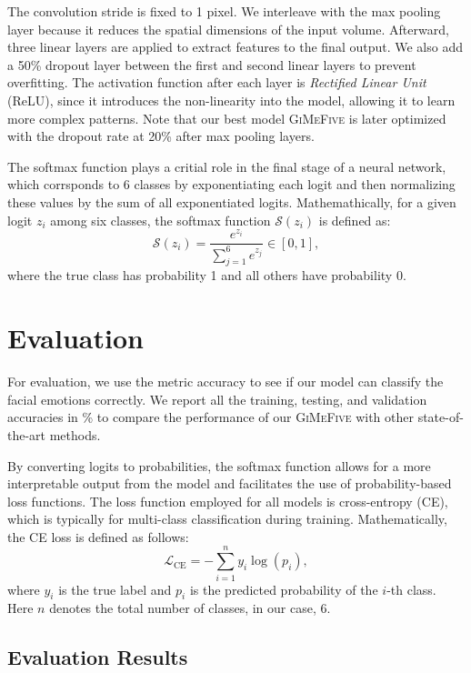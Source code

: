 The convolution stride is fixed to 1 pixel. 
We interleave with the max pooling layer because it reduces the spatial dimensions of the input volume. 
Afterward, three linear layers are applied to extract features to the final output. 
We also add a 50\% dropout layer between the first and second linear layers to prevent overfitting. 
The activation function after each layer is \textit{Rectified Linear Unit} (ReLU), 
since it introduces the non-linearity into the model, 
allowing it to learn more complex patterns. 
Note that our best model \textsc{GiMeFive} is later optimized with the dropout rate at 20\% after max pooling layers. 

The softmax function plays a critial role in the final stage of a neural network, 
which corrsponds to 6 classes by exponentiating each logit and then normalizing these values by the sum of all exponentiated logits. 
Mathemathically, for a given logit $z_i$ among six classes, 
the softmax function $\mathcal{S}(z_i)$ is defined as:
\begin{equation}
  \mathcal{S}(z_i) = \frac{e^{z_i}}{\sum_{j=1}^{6} e^{z_j}} \in [0,1], 
\end{equation}
where the true class has probability 1 and all others have probability 0. 

\section{Evaluation}
\label{sec:evaluation}

For evaluation, we use the metric accuracy to see if our model can classify the facial emotions correctly. 
We report all the training, testing, and validation accuracies in 
\% to compare the performance of our \textsc{GiMeFive} with other state-of-the-art methods. 

By converting logits to probabilities, 
the softmax function allows for a more interpretable output from the model and facilitates the use of probability-based loss functions. 
The loss function employed for all models is cross-entropy (CE), 
which is typically for multi-class classification during training. 
Mathematically, the CE loss is defined as follows: 
\begin{equation}
  \mathcal{L}_{\text{CE}} = -\sum_{i=1}^{n} y_i \log(p_i),
\end{equation}
where $y_i$ is the true label and $p_i$ is the predicted probability of the $i$-th class. 
Here $n$ denotes the total number of classes, in our case, 6.

\subsection{Evaluation Results}
\label{sec:evaluation:results}


